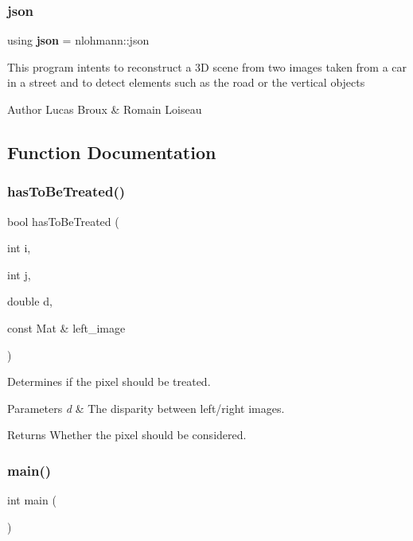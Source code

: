 \subsubsection{json}
{\footnotesize\ttfamily using \textbf{ json} =  nlohmann\+::json}

This program intents to reconstruct a 3D scene from two images taken from a car in a street and to detect elements such as the road or the vertical objects \begin{DoxyAuthor}{Author}
Lucas Broux \& Romain Loiseau 
\end{DoxyAuthor}


\subsection{Function Documentation}
\mbox{\label{projet_8cpp_a51661db0d98d3b889acb2cc3aab03837}} 
\subsubsection{has\+To\+Be\+Treated()}
{\footnotesize\ttfamily bool has\+To\+Be\+Treated (\begin{DoxyParamCaption}\item[{int}]{i,  }\item[{int}]{j,  }\item[{double}]{d,  }\item[{const Mat \&}]{left\+\_\+image }\end{DoxyParamCaption})\hspace{0.3cm}{\ttfamily [inline]}}

Determines if the pixel should be treated.


\begin{DoxyParams}{Parameters}
{\em d} & The disparity between left/right images. \\
\hline
\end{DoxyParams}
\begin{DoxyReturn}{Returns}
Whether the pixel should be considered. 
\end{DoxyReturn}
\mbox{\label{projet_8cpp_ae66f6b31b5ad750f1fe042a706a4e3d4}} 
\subsubsection{main()}
{\footnotesize\ttfamily int main (\begin{DoxyParamCaption}{ }\end{DoxyParamCaption})}

